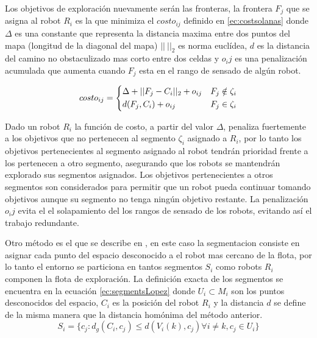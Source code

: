 Los objetivos de exploración nuevamente serán las fronteras, la frontera $F_j$ que se asigna al robot $R_i$ es la que minimiza el $costo_{ij}$ definido en \ref{ec:costsolanas} donde $\Delta$ es una constante que representa la distancia maxima entre dos puntos del mapa (longitud de la diagonal del mapa) $||\ ||_2$ es norma euclídea, $d$ es la distancia del camino no obstaculizado mas corto entre dos celdas y $o_ij$ es una penalización acumulada que aumenta cuando $F_j$ esta en el rango de sensado de algún robot.

\begin{equation}\label{ec:costsolanas}
costo_{ij} = 
\begin{dcases}
  \Delta + || F_j - C_i ||_2 + o_{ij} & F_j \notin \zeta_i \\
  d(F_j, C_i) + o_{ij}                & F_j \in    \zeta_i
\end{dcases}
\end{equation}

Dado un robot $R_i$ la función de costo, a partir del valor $\Delta$, penaliza fuertemente a los objetivos que no pertenecen al segmento $\zeta_i$ asignado a $R_i$, por lo tanto los objetivos pertenecientes al segmento asignado al robot tendrán prioridad frente a los pertenecen a otro segmento, asegurando que los robots se mantendrán explorado sus segmentos asignados. Los objetivos pertenecientes a otros segmentos son considerados para permitir que un robot pueda continuar tomando objetivos aunque su segmento no tenga ningún objetivo restante. La penalización $o_ij$ evita el el solapamiento del los rangos de sensado de los robots, evitando así el trabajo redundante.\medbreak

Otro método es el que se describe en \cite{Lopez-Perez2018}, en este caso la segmentacion consiste en asignar cada punto del espacio desconocido a el robot mas cercano de la flota, por lo tanto el entorno se particiona en tantos segmentos $S_i$ como robots $R_i$ componen la flota de exploración. La definición exacta de los segmentos se encuentra en la ecuación \ref{ec:segmentsLopez} donde $U_i \subset M_i$ son los puntos desconocidos del espacio, $C_i$ es la posición del robot $R_i$ y la distancia $d$ se define de la misma manera que la distancia homónima del método anterior.
\begin{equation}\label{ec:segmentsLopez}
  S_i=\{c_j:d_g(C_i,c_j)\leq d(V_i(k),c_j) \forall i \neq k , c_j \in U_i\}
\end{equation}


